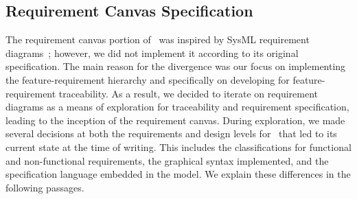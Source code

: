 %



\subsection{Requirement Canvas Specification}

The requirement canvas portion of \tool\ was inspired by SysML requirement diagrams~\cite {sysml2019omg}; however, we did not implement it according to its original specification. The main reason for the divergence was our focus on implementing the feature-requirement hierarchy and specifically on developing for feature-requirement traceability. As a result, we decided to iterate on requirement diagrams as a means of exploration for traceability and requirement specification, leading to the inception of the requirement canvas. During exploration, we made several decisions at both the requirements and design levels for \tool\ that led to its current state at the time of writing. This includes the classifications for functional and non-functional requirements, the graphical syntax implemented, and the specification language embedded in the model. We explain these differences in the following passages.

